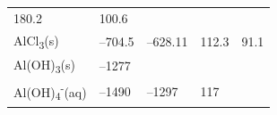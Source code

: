 \documentclass[
  9pt,
]{extbook}
\theoremstyle{definition}
\theoremstyle{definition}
\theoremstyle{definition}
\theoremstyle{remark}
\begin{document}
\begin{longtable}[]{@{}lllll@{}}
\begin{minipage}[t]{0.18\columnwidth}
180.2\strut
\end{minipage} & \begin{minipage}[t]{0.18\columnwidth}\raggedright
100.6\strut
\end{minipage}\tabularnewline
\begin{minipage}[t]{0.10\columnwidth}\raggedright
AlCl\textsubscript{3}(s)\strut
\end{minipage} & \begin{minipage}[t]{0.19\columnwidth}\raggedright
--704.5\strut
\end{minipage} & \begin{minipage}[t]{0.20\columnwidth}\raggedright
--628.11\strut
\end{minipage} & \begin{minipage}[t]{0.18\columnwidth}\raggedright
112.3\strut
\end{minipage} & \begin{minipage}[t]{0.18\columnwidth}\raggedright
91.1\strut
\end{minipage}\tabularnewline
\begin{minipage}[t]{0.10\columnwidth}\raggedright
Al(OH)\textsubscript{3}(s)\strut
\end{minipage} & \begin{minipage}[t]{0.19\columnwidth}\raggedright
--1277\strut
\end{minipage} & \begin{minipage}[t]{0.20\columnwidth}\raggedright
\strut
\end{minipage} & \begin{minipage}[t]{0.18\columnwidth}\raggedright
\strut
\end{minipage} & \begin{minipage}[t]{0.18\columnwidth}\raggedright
\strut
\end{minipage}\tabularnewline
\begin{minipage}[t]{0.10\columnwidth}\raggedright
Al(OH)\textsubscript{4}\textsuperscript{-}(aq)\strut
\end{minipage} & \begin{minipage}[t]{0.19\columnwidth}\raggedright
--1490\strut
\end{minipage} & \begin{minipage}[t]{0.20\columnwidth}\raggedright
--1297\strut
\end{minipage} & \begin{minipage}[t]{0.18\columnwidth}\raggedright
117\strut
\end{minipage} & \begin{minipage}[t]{0.18\columnwidth}\raggedright

\end{minipage}
\end{longtable}
\end{document}

